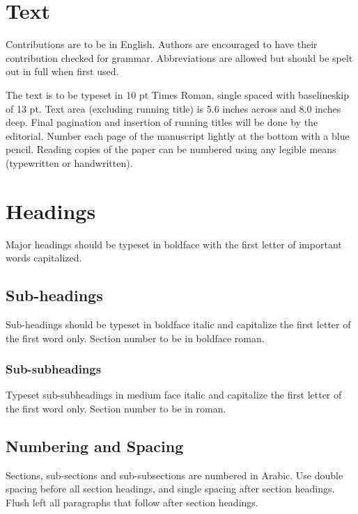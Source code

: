 \documentclass[twoside]{article}
\renewcommand{\thefootnote}{\fnsymbol{footnote}}  %
\begin{document}
\section{Text}
\noindent
Contributions are to be in English. Authors are encouraged to
have their contribution checked for grammar.  
Abbreviations are allowed but should be spelt
out in full when first used. 

\setcounter{footnote}{0}
\renewcommand{\thefootnote}{\alph{footnote}}

The text is to be typeset in 10 pt Times Roman, single spaced
with baselineskip of 13 pt. Text area (excluding running title)
is 5.6 inches across and 8.0 inches deep.
Final pagination and insertion of running titles will be done by
the editorial. Number each page of the manuscript lightly at the
bottom with a blue pencil. Reading copies of the paper can be
numbered using any legible means (typewritten or handwritten).

\section{Headings}
\noindent
Major headings should be typeset in boldface with the first
letter of important words capitalized.

\subsection{Sub-headings}
\noindent
Sub-headings should be typeset in boldface italic and capitalize
the first letter of the first word only. Section number to be in
boldface roman.

\subsubsection{Sub-subheadings}
\noindent
Typeset sub-subheadings in medium face italic and capitalize the
first letter of the first word only. Section number to be in
roman.

\subsection{Numbering and Spacing}
\noindent
Sections, sub-sections and sub-subsections are numbered in
Arabic.  Use double spacing before all section headings, and
single spacing after section headings. Flush left all paragraphs
that follow after section headings.
\end{document}
